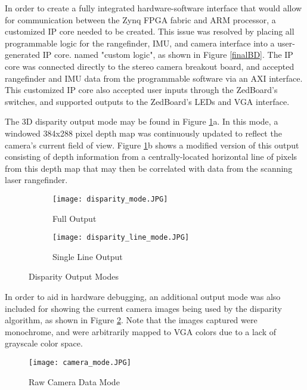 In order to create a fully integrated hardware-software interface that would allow for communication between the Zynq FPGA fabric and ARM processor, a customized IP core needed to be created. This issue was resolved by placing all programmable logic for the rangefinder, IMU, and camera interface into a user-generated IP core. named "custom logic", as shown in Figure \ref{finalBD}. The IP core was connected directly to the stereo camera breakout board, and accepted rangefinder and IMU data from the programmable software via an AXI interface. This customized IP core also accepted user inputs through the ZedBoard's switches, and supported outputs to the ZedBoard's LEDs and VGA interface. 
\par
The 3D disparity output mode may be found in Figure \ref{disparityOutputs}a. In this mode, a windowed 384x288 pixel depth map was continuously updated to reflect the camera's current field of view. Figure \ref{disparityOutputs}b shows a modified version of this output consisting of depth information from a centrally-located horizontal line of pixels from this depth map that may then be correlated with data from the scanning laser rangefinder. 

\begin{figure}[H] 
         \begin{subfigure}[h]{0.5\textwidth}
              \centerline{\texttt{[image: disparity\_mode.JPG]}}
             \caption{Full Output}
         \end{subfigure}
         \begin{subfigure}[h]{0.5\textwidth}
             \centerline{\texttt{[image: disparity\_line\_mode.JPG]}}
             \caption{Single Line Output}
         \end{subfigure}
\caption{Disparity Output Modes}
\label{disparityOutputs}
\end{figure}

In order to aid in hardware debugging, an additional output mode was also included for showing the current camera images being used by the disparity algorithm, as shown in Figure \ref{camOutMode}. Note that the images captured were monochrome, and were arbitrarily mapped to VGA colors due to a lack of grayscale color space.

\begin{figure}[H]  
 	\centerline{
	\texttt{[image: camera\_mode.JPG]}
	}
	\caption{Raw Camera Data Mode}
	\label{camOutMode}
\end{figure} 

